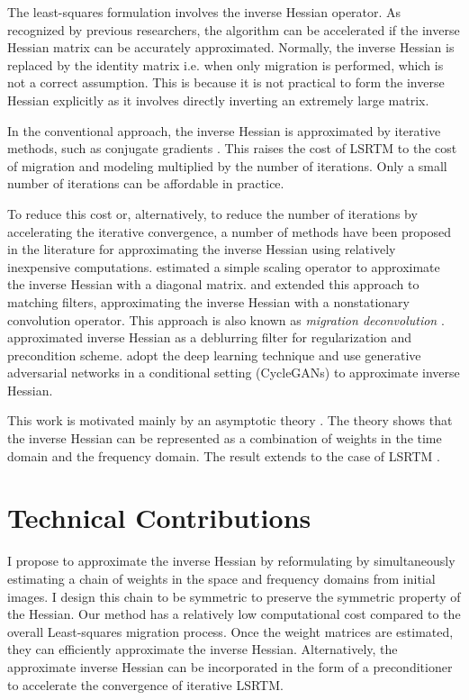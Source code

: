 The least-squares formulation involves the inverse Hessian operator. As recognized by previous researchers, the algorithm can be accelerated if the inverse Hessian matrix can be accurately approximated. Normally, the inverse Hessian is replaced by the identity matrix i.e. when only migration is performed, which is not a correct assumption. This is because it is not practical to form the inverse Hessian explicitly as it involves directly inverting an extremely large matrix.

In the conventional approach, the inverse Hessian is approximated by iterative methods, such as conjugate gradients \cite[]{tarantola,sun,xue}. This raises the cost of LSRTM to the cost of migration and modeling multiplied by the number of iterations. Only a small number of iterations can be affordable in practice. 

To reduce this cost or, alternatively, to reduce the number of iterations by accelerating the iterative convergence, a number of methods have been proposed in the literature for approximating the inverse Hessian using relatively inexpensive computations. \cite{rickett} estimated a simple scaling operator to approximate the inverse Hessian with a diagonal matrix. \cite{guitton} and \cite{greer} extended this approach to matching filters, approximating the inverse Hessian with a nonstationary convolution operator. This approach is also known as \emph{migration deconvolution} \cite[]{hu2001,yu2006}. \cite{aoki} approximated inverse Hessian as a deblurring filter for regularization and precondition scheme. \cite{kaur} adopt the deep learning technique and use generative adversarial networks in a conditional setting (CycleGANs) to approximate inverse Hessian.


This work is motivated mainly by an asymptotic theory \cite[]{miller1987,bleistein1987}. The theory shows that the inverse Hessian can be represented as a combination of weights in the time domain and the frequency domain. The result extends to the case of LSRTM \cite[]{hou15,hou16}. 

\section{Technical Contributions}

I propose to approximate the inverse Hessian by reformulating by simultaneously estimating a chain of weights in the space and frequency domains from initial images. I design this chain to be symmetric to preserve the symmetric property of the Hessian. Our method has a relatively low computational cost compared to the overall Least-squares migration process. Once the weight matrices are estimated, they can efficiently approximate the inverse Hessian. Alternatively, the approximate inverse Hessian can be incorporated in the form of a preconditioner to accelerate the convergence of iterative LSRTM.


